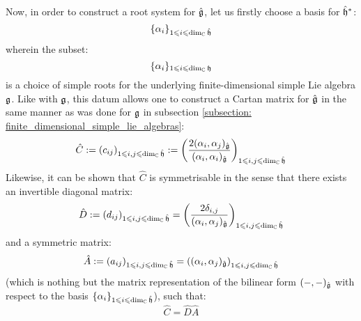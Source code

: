         Now, in order to construct a root system for $\hat{\mathfrak{g}}$, let us firstly choose a basis for $\hat{\mathfrak{h}}^*$:
            $$\{\alpha_i\}_{1 \leqslant i \leqslant \dim_{\mathbb{C}} \hat{\mathfrak{h}}}$$
        wherein the subset:
            $$\{\alpha_i\}_{1 \leqslant i \leqslant \dim_{\mathbb{C}} \mathfrak{h}}$$
        is a choice of simple roots for the underlying finite-dimensional simple Lie algebra $\mathfrak{g}$. Like with $\mathfrak{g}$, this datum allows one to construct a Cartan matrix for $\hat{\mathfrak{g}}$ in the same manner as was done for $\mathfrak{g}$ in subsection \ref{subsection: finite_dimensional_simple_lie_algebras}:
            $$\hat{C} := (c_{ij})_{1 \leqslant i, j \leqslant \dim_{\mathbb{C}} \hat{\mathfrak{h}}} := \left( \frac{2(\alpha_i, \alpha_j)_{\hat{\mathfrak{g}}}}{(\alpha_i, \alpha_i)_{\hat{\mathfrak{g}}}} \right)_{1 \leqslant i, j \leqslant \dim_{\mathbb{C}} \hat{\mathfrak{h}}}$$
        Likewise, it can be shown that $\hat{C}$ is symmetrisable in the sense that there exists an invertible diagonal matrix:
            $$\hat{D} := (d_{ij})_{1 \leqslant i, j \leqslant \dim_{\mathbb{C}} \hat{\mathfrak{h}}} = \left(\frac{2\delta_{i, j}}{(\alpha_i, \alpha_j)_{\hat{\mathfrak{g}}}}\right)_{1 \leqslant i, j \leqslant \dim_{\mathbb{C}} \hat{\mathfrak{h}}}$$
        and a symmetric matrix:
            $$\hat{A} := (a_{ij})_{1 \leqslant i, j \leqslant \dim_{\mathbb{C}} \hat{\mathfrak{h}}} = \left((\alpha_i, \alpha_j)_{\hat{\mathfrak{g}}}\right)_{1 \leqslant i, j \leqslant \dim_{\mathbb{C}} \hat{\mathfrak{h}}}$$
        (which is nothing but the matrix representation of the bilinear form $(-, -)_{\hat{\mathfrak{g}}}$ with respect to the basis $\{\alpha_i\}_{1 \leqslant i \leqslant \dim_{\mathbb{C}} \hat{\mathfrak{h}}}$), such that:
            $$\hat{C} = \hat{D} \hat{A}$$
        
